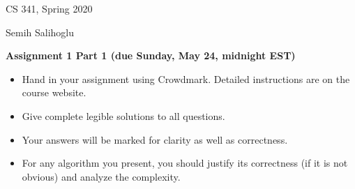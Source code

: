\documentclass[11pt]{article}
\begin{document}

\hfill CS 341, Spring 2020\par
\hfill Semih Salihoglu

\bigskip
\begin{center}\large\bf Assignment 1 Part 1 (due Sunday, May 24, midnight EST)
\end{center}

\begin{itemize}
\item Hand in your assignment using Crowdmark. Detailed instructions are on the course website.
\item Give complete legible solutions to all questions.
\item Your answers will be marked for clarity as well as correctness.
\item For any algorithm you present, you should justify its correctness
(if it is not obvious) and analyze the complexity.
\end{itemize}
\end{document}
